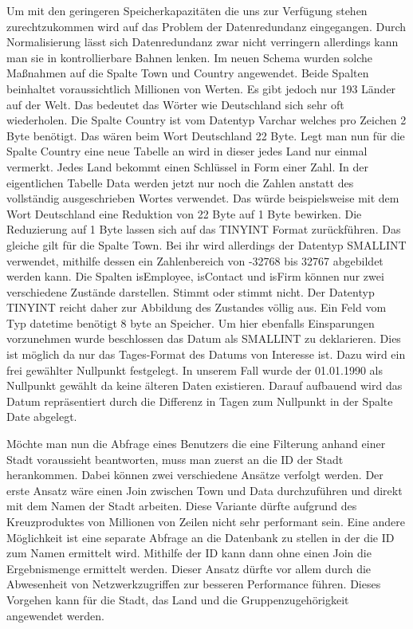 Um mit den geringeren Speicherkapazitäten die uns zur Verfügung stehen zurechtzukommen wird auf das Problem der Datenredundanz eingegangen. Durch Normalisierung lässt sich Datenredundanz zwar nicht verringern allerdings kann man sie in kontrollierbare Bahnen lenken. Im neuen Schema wurden solche Maßnahmen auf die Spalte Town und Country angewendet. Beide Spalten beinhaltet voraussichtlich Millionen von Werten. Es gibt jedoch nur 193 Länder auf der Welt. Das bedeutet das Wörter wie Deutschland sich sehr oft wiederholen. Die Spalte Country ist vom Datentyp Varchar welches pro Zeichen 2 Byte benötigt. Das wären beim Wort Deutschland 22 Byte. Legt man nun für die Spalte Country eine neue Tabelle an wird in dieser jedes Land nur einmal vermerkt. Jedes Land bekommt einen Schlüssel in Form einer Zahl. In der eigentlichen Tabelle Data werden jetzt nur noch die Zahlen anstatt des vollständig ausgeschrieben Wortes verwendet. Das würde beispielsweise mit dem Wort Deutschland eine Reduktion von 22 Byte auf 1 Byte bewirken. Die Reduzierung auf 1 Byte lassen sich auf das TINYINT Format zurückführen. Das gleiche gilt für die Spalte Town. Bei ihr wird allerdings der Datentyp SMALLINT verwendet, mithilfe dessen ein Zahlenbereich von -32768 bis 32767 abgebildet werden kann. Die Spalten isEmployee, isContact und isFirm können nur zwei verschiedene Zustände darstellen. Stimmt oder stimmt nicht. Der Datentyp TINYINT reicht daher zur Abbildung des Zustandes völlig aus. Ein Feld vom Typ datetime benötigt 8 byte an Speicher. Um hier ebenfalls Einsparungen vorzunehmen wurde beschlossen das Datum als SMALLINT zu deklarieren. Dies ist möglich da nur das Tages-Format des Datums von Interesse ist. Dazu wird ein frei gewählter Nullpunkt festgelegt. In unserem Fall wurde der 01.01.1990 als Nullpunkt gewählt da keine älteren Daten existieren. Darauf aufbauend wird das Datum repräsentiert durch die Differenz in Tagen zum Nullpunkt in der Spalte Date abgelegt.

Möchte man nun die Abfrage eines Benutzers die eine Filterung anhand einer Stadt voraussieht beantworten, muss man zuerst an die ID der Stadt herankommen. Dabei können zwei verschiedene Ansätze verfolgt werden. Der erste Ansatz wäre einen Join zwischen Town und Data durchzuführen und direkt mit dem Namen der Stadt arbeiten. Diese Variante dürfte aufgrund des Kreuzproduktes von Millionen von Zeilen nicht sehr performant sein. Eine andere Möglichkeit ist eine separate Abfrage an die Datenbank zu stellen in der die ID zum Namen ermittelt wird. Mithilfe der ID kann dann ohne einen Join die Ergebnismenge ermittelt werden. Dieser Ansatz dürfte vor allem durch die Abwesenheit von Netzwerkzugriffen zur besseren Performance führen. Dieses Vorgehen kann für die Stadt, das Land und die Gruppenzugehörigkeit angewendet werden.


